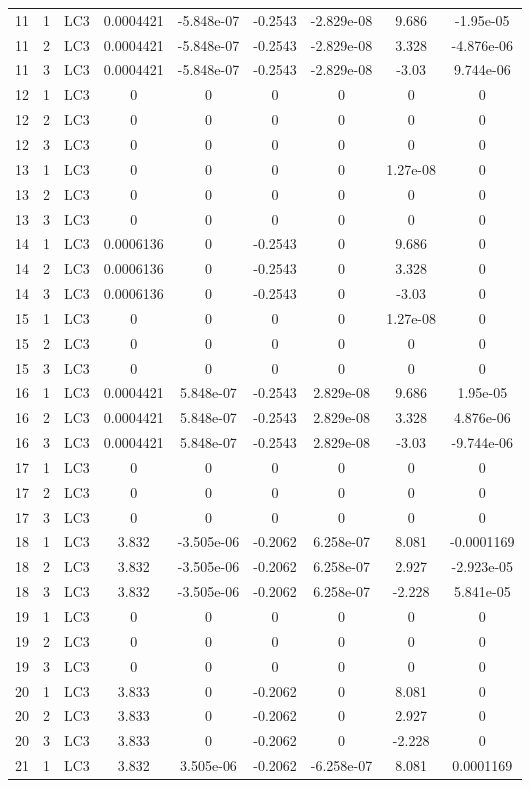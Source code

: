 \documentclass{article}%
\begin{document}
\begin{longtable}{| c c c | c c c c c c |}
11&1&LC3&0.0004421&{-}5.848e{-}07&{-}0.2543&{-}2.829e{-}08&9.686&{-}1.95e{-}05\\%
11&2&LC3&0.0004421&{-}5.848e{-}07&{-}0.2543&{-}2.829e{-}08&3.328&{-}4.876e{-}06\\%
11&3&LC3&0.0004421&{-}5.848e{-}07&{-}0.2543&{-}2.829e{-}08&{-}3.03&9.744e{-}06\\%
12&1&LC3&0&0&0&0&0&0\\%
12&2&LC3&0&0&0&0&0&0\\%
12&3&LC3&0&0&0&0&0&0\\%
13&1&LC3&0&0&0&0&1.27e{-}08&0\\%
13&2&LC3&0&0&0&0&0&0\\%
13&3&LC3&0&0&0&0&0&0\\%
14&1&LC3&0.0006136&0&{-}0.2543&0&9.686&0\\%
14&2&LC3&0.0006136&0&{-}0.2543&0&3.328&0\\%
14&3&LC3&0.0006136&0&{-}0.2543&0&{-}3.03&0\\%
15&1&LC3&0&0&0&0&1.27e{-}08&0\\%
15&2&LC3&0&0&0&0&0&0\\%
15&3&LC3&0&0&0&0&0&0\\%
16&1&LC3&0.0004421&5.848e{-}07&{-}0.2543&2.829e{-}08&9.686&1.95e{-}05\\%
16&2&LC3&0.0004421&5.848e{-}07&{-}0.2543&2.829e{-}08&3.328&4.876e{-}06\\%
16&3&LC3&0.0004421&5.848e{-}07&{-}0.2543&2.829e{-}08&{-}3.03&{-}9.744e{-}06\\%
17&1&LC3&0&0&0&0&0&0\\%
17&2&LC3&0&0&0&0&0&0\\%
17&3&LC3&0&0&0&0&0&0\\%
18&1&LC3&3.832&{-}3.505e{-}06&{-}0.2062&6.258e{-}07&8.081&{-}0.0001169\\%
18&2&LC3&3.832&{-}3.505e{-}06&{-}0.2062&6.258e{-}07&2.927&{-}2.923e{-}05\\%
18&3&LC3&3.832&{-}3.505e{-}06&{-}0.2062&6.258e{-}07&{-}2.228&5.841e{-}05\\%
19&1&LC3&0&0&0&0&0&0\\%
19&2&LC3&0&0&0&0&0&0\\%
19&3&LC3&0&0&0&0&0&0\\%
20&1&LC3&3.833&0&{-}0.2062&0&8.081&0\\%
20&2&LC3&3.833&0&{-}0.2062&0&2.927&0\\%
20&3&LC3&3.833&0&{-}0.2062&0&{-}2.228&0\\%
21&1&LC3&3.832&3.505e{-}06&{-}0.2062&{-}6.258e{-}07&8.081&0.0001169\\%

\end{longtable}
\end{document}
